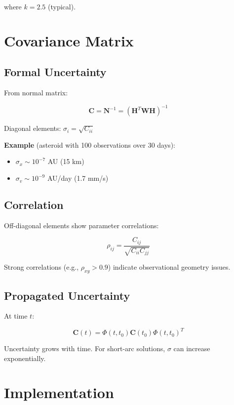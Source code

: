 where $k = 2.5$ (typical).

\section{Covariance Matrix}

\subsection{Formal Uncertainty}

From normal matrix:

\begin{equation}
    \mathbf{C} = \mathbf{N}^{-1} = (\mathbf{H}^T \mathbf{W} \mathbf{H})^{-1}
\end{equation}

Diagonal elements: $\sigma_i = \sqrt{C_{ii}}$

\textbf{Example} (asteroid with 100 observations over 30 days):
\begin{itemize}
    \item $\sigma_x \sim 10^{-7}$ AU (15 km)
    \item $\sigma_v \sim 10^{-9}$ AU/day (1.7 mm/s)
\end{itemize}

\subsection{Correlation}

Off-diagonal elements show parameter correlations:

\begin{equation}
    \rho_{ij} = \frac{C_{ij}}{\sqrt{C_{ii} C_{jj}}}
\end{equation}

Strong correlations (e.g., $\rho_{xy} > 0.9$) indicate observational geometry issues.

\subsection{Propagated Uncertainty}

At time $t$:

\begin{equation}
    \mathbf{C}(t) = \Phi(t, t_0) \mathbf{C}(t_0) \Phi(t, t_0)^T
\end{equation}

Uncertainty grows with time. For short-arc solutions, $\sigma$ can increase exponentially.

\section{Implementation}

